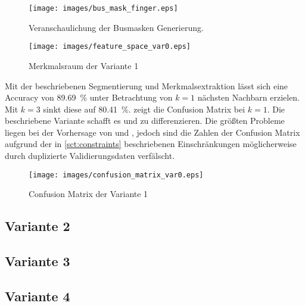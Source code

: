 \begin{figure}[ht]
    \centering
    \texttt{[image: images/bus\_mask\_finger.eps]}
    \caption{Veranschaulichung der Busmasken Generierung.\label{fig:bus_mask_finger}}
\end{figure}

\begin{figure}[ht]
    \centering
    \texttt{[image: images/feature\_space\_var0.eps]}
    \caption{Merkmalsraum der Variante 1\label{fig:feature_space_var0}}
\end{figure}

Mit der beschriebenen Segmentierung und Merkmalsextraktion lässt sich eine \foreignlanguage{english}{Accuracy} von \SI{89.69}{\percent} unter Betrachtung von \(k = 1\) nächsten Nachbarn erzielen. Mit \(k = 3\) sinkt diese auf \SI{80.41}{\percent}.  zeigt die \foreignlanguage{english}{Confusion Matrix} bei \(k = 1\). Die beschriebene Variante schafft es  und  zu differenzieren. Die größten Probleme liegen bei der Vorhersage von  und , jedoch sind die Zahlen der \foreignlanguage{english}{Confusion Matrix} aufgrund der in \cref{sct:constraints} beschriebenen Einschränkungen möglicherweise durch duplizierte Validierungsdaten verfälscht.

\begin{figure}[ht]
    \centering
    \texttt{[image: images/confusion\_matrix\_var0.eps]}
    \caption{\foreignlanguage{english}{Confusion Matrix} der Variante 1\label{fig:confusion_matrix_var0}}
\end{figure}

\subsection{Variante 2}

\subsection{Variante 3}

\subsection{Variante 4}
